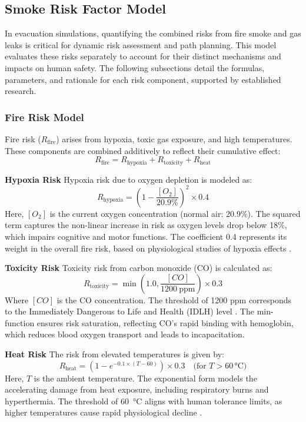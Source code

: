 \subsection{Smoke Risk Factor Model}

In evacuation simulations, quantifying the combined risks from fire smoke and gas leaks is critical for dynamic risk assessment and path planning. This model evaluates these risks separately to account for their distinct mechanisms and impacts on human safety. The following subsections detail the formulas, parameters, and rationale for each risk component, supported by established research.


\subsubsection{Fire Risk Model}

Fire risk ($R_{\text{fire}}$) arises from hypoxia, toxic gas exposure, and high temperatures. These components are combined additively to reflect their cumulative effect:
\begin{equation}
R_{\text{fire}} = R_{\text{hypoxia}} + R_{\text{toxicity}} + R_{\text{heat}}
\end{equation}

\textbf{Hypoxia Risk}
Hypoxia risk due to oxygen depletion is modeled as:
\begin{equation}
R_{\text{hypoxia}} = \left(1 - \frac{[O_2]}{20.9\%}\right)^2 \times 0.4
\end{equation}
Here, $[O_2]$ is the current oxygen concentration (normal air: 20.9\%). The squared term captures the non-linear increase in risk as oxygen levels drop below 18\%, which impairs cognitive and motor functions. The coefficient 0.4 represents its weight in the overall fire risk, based on physiological studies of hypoxia effects \cite{Jin1978}.

\textbf{Toxicity Risk}
Toxicity risk from carbon monoxide (CO) is calculated as:
\begin{equation}
R_{\text{toxicity}} = \min\left(1.0, \frac{[CO]}{1200\ \text{ppm}}\right) \times 0.3
\end{equation}
Where $[CO]$ is the CO concentration. The threshold of 1200 ppm corresponds to the Immediately Dangerous to Life and Health (IDLH) level \cite{NIOSH_CO}. The min-function ensures risk saturation, reflecting CO's rapid binding with hemoglobin, which reduces blood oxygen transport and leads to incapacitation.

\textbf{Heat Risk}
The risk from elevated temperatures is given by:
\begin{equation}
R_{\text{heat}} = \left(1 - e^{-0.1 \times (T - 60)}\right) \times 0.3 \quad \text{(for \(T > 60\,\si{\celsius}\))}
\end{equation}
Here, $T$ is the ambient temperature. The exponential form models the accelerating damage from heat exposure, including respiratory burns and hyperthermia. The threshold of \SI{60}{\celsius} aligns with human tolerance limits, as higher temperatures cause rapid physiological decline \cite{ISO13571}.



